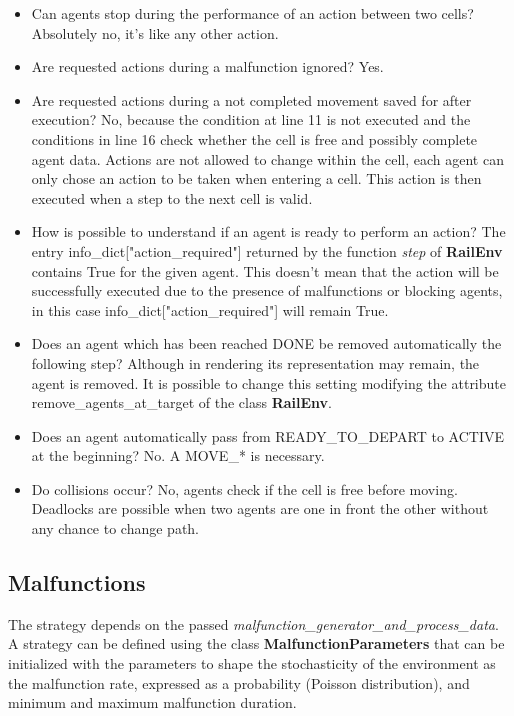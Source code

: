 \documentclass[11pt, a4paper, hidelinks]{report}
\begin{document}
\begin{itemize}
	\item Can agents stop during the performance of an action between two cells?
Absolutely no, it's like any other action.
	\item Are requested actions during a malfunction ignored?
Yes.
	\item Are requested actions during a not completed movement saved for after execution?
No, because the condition at line 11 is not executed and the conditions in line 16 check whether the cell is free and possibly complete agent data.
Actions are not allowed to change within the cell, each agent can only chose an action to be taken when entering a cell.
This action is then executed when a step to the next cell is valid.
	\item How is possible to understand if an agent is ready to perform an action?
The entry info\_dict["action\_required"] returned by the function \textit{step} of \textbf{RailEnv} contains True for the given agent.
This doesn't mean that the action will be successfully executed due to the presence of malfunctions or blocking agents, in this case info\_dict["action\_required"] will remain True.
	\item Does an agent which has been reached DONE be removed automatically the following step?
Although in rendering its representation may remain, the agent is removed.
It is possible to change this setting modifying the attribute remove\_agents\_at\_target of the class \textbf{RailEnv}.
	\item Does an agent automatically pass from READY\_TO\_DEPART to ACTIVE at the beginning?
No. A MOVE\_* is necessary.
	\item Do collisions occur?
No, agents check if the cell is free before moving.
Deadlocks are possible when two agents are one in front the other without any chance to change path.
\end{itemize}

\subsection{Malfunctions}\label{subsec:malfunctions}
The strategy depends on the passed \textit{malfunction\_generator\_and\_process\_data}.
A strategy can be defined using the class \textbf{MalfunctionParameters} that can be initialized with the parameters to shape the stochasticity of the environment as the malfunction rate, expressed as a probability (Poisson distribution), and minimum and maximum malfunction duration.
\end{document}
